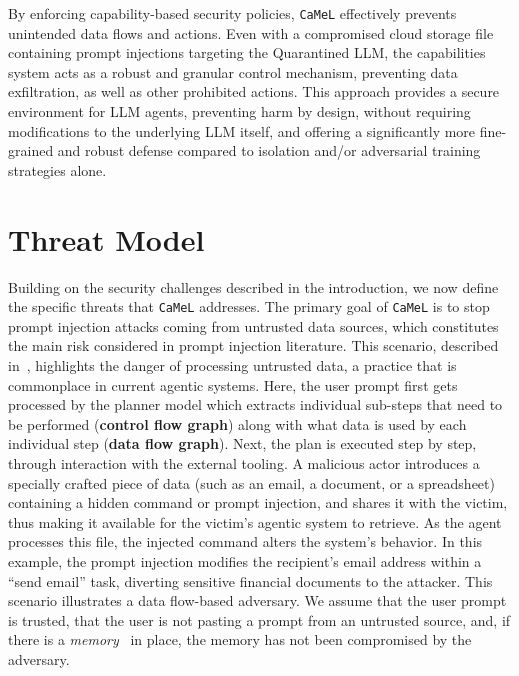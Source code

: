 \documentclass[11pt, a4paper, logo, copyright]{googledeepmind}
\newcommand{\sysname}{\texttt{CaMeL}\xspace}
\begin{document}
By enforcing capability-based security policies, \sysname{} effectively prevents unintended data flows and actions. Even with a compromised cloud storage file containing prompt injections targeting the Quarantined LLM, the capabilities system acts as a robust and granular control mechanism, preventing data exfiltration, as well as other prohibited actions. This approach provides a secure environment for LLM agents, preventing harm by design, without requiring modifications to the underlying LLM itself, and offering a significantly more fine-grained and robust defense compared to isolation and/or adversarial training strategies alone.


\section{Threat Model}\label{sec:threat-model}
Building on the security challenges described in the introduction, we now define the specific threats that \sysname{} addresses. The primary goal of \sysname{} is to stop prompt injection attacks coming from untrusted data sources, which constitutes the main risk considered in prompt injection literature. This scenario, described in~, highlights the danger of processing untrusted data, a practice that is commonplace in current agentic systems. Here, the user prompt first gets processed by the planner model which extracts individual sub-steps that need to be performed (\textbf{control flow graph}) along with what data is used by each individual step (\textbf{data flow graph}). Next, the plan is executed step by step, through interaction with the external tooling. A malicious actor introduces a specially crafted piece of data (such as an email, a document, or a spreadsheet) containing a hidden command or prompt injection, and shares it with the victim, thus making it available for the victim's agentic system to retrieve. As the agent processes this file, the injected command alters the system's behavior. In this example, the prompt injection modifies the recipient's email address within a ``send email'' task, diverting sensitive financial documents to the attacker. This scenario illustrates a data flow-based adversary. We assume that the user prompt is trusted, that the user is not pasting a prompt from an untrusted source, and, if there is a \textit{memory}~\citep{wang2024augmenting} in place, the memory has not been compromised by the adversary.
\end{document}
